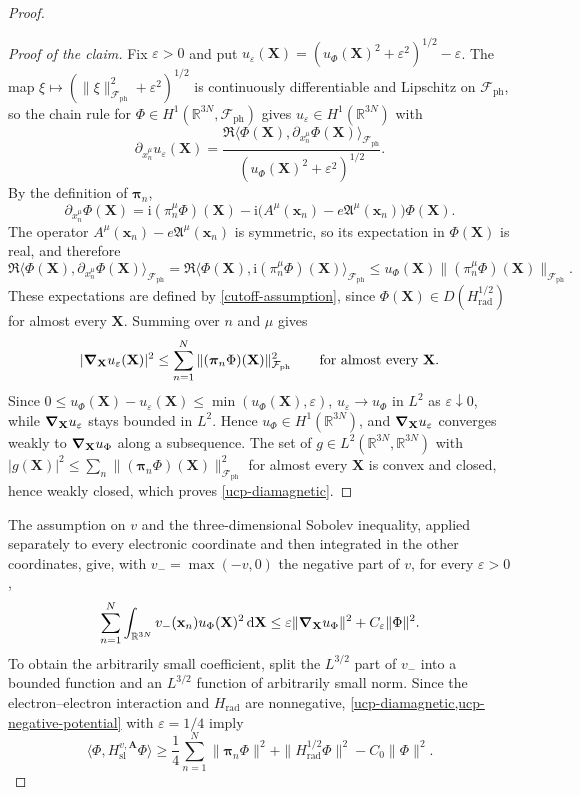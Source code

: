 \documentclass[final,reqno]{amsart}
\theoremstyle{remark}
\newcommand{\RR}{\mathbb{R}}
\renewcommand{\i}{\mathrm{i}}
\newcommand{\dua}[2]{\langle #1, #2 \rangle}
\newcommand{\DC}{D}
\newcommand{\Af}{\mathfrak{A}}
\newcommand{\ph}{\mathrm{ph}}
\newcommand{\rad}{\mathrm{rad}}
\newcommand{\Fock}{\mathcal{F}}
\newcommand{\vpi}{{\bm{\pi}}}
\newcommand{\vx}{\mathbf{x}}
\newcommand{\vA}{{\mathbf{A}}}
\newcommand{\vX}{{\mathbf{X}}}
\renewcommand{\epsilon}{\varepsilon}
\begin{document}
\begin{proof}
\begin{proof}[Proof of the claim]
Fix $\epsilon>0$ and put
$u_\epsilon(\vX)=(u_\Phi(\vX)^2+\epsilon^2)^{1/2}-\epsilon$.  The map
$\xi\mapsto(\|\xi\|_{\Fock_\ph}^2+\epsilon^2)^{1/2}$ is continuously
differentiable and Lipschitz on $\Fock_\ph$, so the chain rule for
$\Phi\in H^1(\RR^{3N},\Fock_\ph)$ gives $u_\epsilon\in H^1(\RR^{3N})$ with
\[
 \partial_{x_n^\mu}u_\epsilon(\vX)
 =\frac{\Re\dua{\Phi(\vX)}{\partial_{x_n^\mu}\Phi(\vX)}_{\Fock_\ph}}
       {(u_\Phi(\vX)^2+\epsilon^2)^{1/2}}.
\]
By the definition of $\vpi_n$,
\[
 \partial_{x_n^\mu}\Phi(\vX)=\i(\pi_n^\mu\Phi)(\vX)
 -\i\bigl(A^\mu(\vx_n)-e\Af^\mu(\vx_n)\bigr)\Phi(\vX).
\]
The operator $A^\mu(\vx_n)-e\Af^\mu(\vx_n)$ is symmetric, so its
expectation in $\Phi(\vX)$ is real, and therefore
\[
 \Re\dua{\Phi(\vX)}{\partial_{x_n^\mu}\Phi(\vX)}_{\Fock_\ph}
 =\Re\dua{\Phi(\vX)}{\i(\pi_n^\mu\Phi)(\vX)}_{\Fock_\ph}
 \leq u_\Phi(\vX)\|(\pi_n^\mu\Phi)(\vX)\|_{\Fock_\ph}.
\]
These expectations are defined by \cref{cutoff-assumption}, since
$\Phi(\vX)\in\DC(H_\rad^{1/2})$ for almost every $\vX$.
Summing over $n$ and $\mu$ gives
\[
 |\grad_{\vX}u_\epsilon(\vX)|^2
 \leq\sum_{n=1}^N\|(\vpi_n\Phi)(\vX)\|_{\Fock_\ph}^2
 \qquad\text{for almost every }\vX.
\]
Since $0\leq u_\Phi(\vX)-u_\epsilon(\vX)\leq\min(u_\Phi(\vX),\epsilon)$,
$u_\epsilon\to u_\Phi$ in $L^2$ as $\epsilon\downarrow0$, while
$\grad_{\vX}u_\epsilon$ stays bounded in $L^2$.  Hence
$u_\Phi\in H^1(\RR^{3N})$, and $\grad_{\vX}u_\epsilon$ converges weakly
to $\grad_{\vX}u_\Phi$ along a subsequence.  The set of
$g\in L^2(\RR^{3N},\RR^{3N})$ with
$|g(\vX)|^2\leq\sum_n\|(\vpi_n\Phi)(\vX)\|_{\Fock_\ph}^2$ for almost
every $\vX$ is convex and closed, hence weakly closed, which proves
\cref{ucp-diamagnetic}.
\end{proof}

The assumption on $v$ and the three-dimensional Sobolev inequality,
applied separately to every electronic coordinate and then integrated
in the other coordinates, give, with $v_-=\max(-v,0)$ the negative part
of $v$, for every $\epsilon>0$,
\begin{equation}\label{ucp-negative-potential}
 \sum_{n=1}^N\int_{\RR^{3N}}v_-(\vx_n)u_\Phi(\vX)^2\dd\vX
 \leq\epsilon\|\grad_{\vX}u_\Phi\|^2
       +C_\epsilon\|\Phi\|^2.
\end{equation}
To obtain the arbitrarily small coefficient, split the $L^{3/2}$
part of $v_-$ into a bounded function and an $L^{3/2}$ function of
arbitrarily small norm.  Since the electron--electron interaction
and $H_\rad$ are nonnegative, \cref{ucp-diamagnetic,ucp-negative-potential}
with $\epsilon=1/4$ imply
\begin{equation}\label{ucp-form-lower-bound}
 \dua{\Phi}{H_{\mathrm{sl}}^{v,\vA}\Phi}\geq\frac14\sum_{n=1}^N\|\vpi_n\Phi\|^2
                +\|H_\rad^{1/2}\Phi\|^2-C_0\|\Phi\|^2.
\end{equation}


\end{proof}
\end{document}
